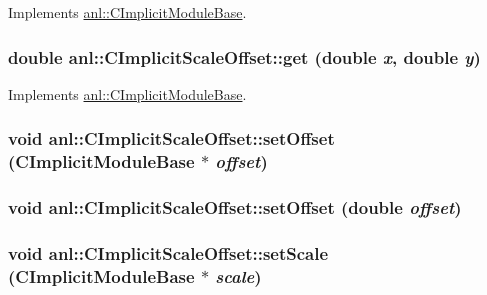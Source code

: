 Implements \hyperlink{classanl_1_1CImplicitModuleBase_ac17d592612c82ba3d47f9229a00b1fe3}{anl::CImplicitModuleBase}.\hypertarget{classanl_1_1CImplicitScaleOffset_ac23178ec8ef455748dfc75684515c291}{
\subsubsection[{get}]{\setlength{\rightskip}{0pt plus 5cm}double anl::CImplicitScaleOffset::get (double {\em x}, \/  double {\em y})}}
\label{classanl_1_1CImplicitScaleOffset_ac23178ec8ef455748dfc75684515c291}


Implements \hyperlink{classanl_1_1CImplicitModuleBase_ab88f8a1822dcfbc13ba5230318b0acd1}{anl::CImplicitModuleBase}.\hypertarget{classanl_1_1CImplicitScaleOffset_a264fb477f5b1e33c6fc395d2a33a3fcf}{
\subsubsection[{setOffset}]{\setlength{\rightskip}{0pt plus 5cm}void anl::CImplicitScaleOffset::setOffset ({\bf CImplicitModuleBase} $\ast$ {\em offset})}}
\label{classanl_1_1CImplicitScaleOffset_a264fb477f5b1e33c6fc395d2a33a3fcf}
\hypertarget{classanl_1_1CImplicitScaleOffset_ae9d26d26b04003bef03f4eb889d00169}{
\subsubsection[{setOffset}]{\setlength{\rightskip}{0pt plus 5cm}void anl::CImplicitScaleOffset::setOffset (double {\em offset})}}
\label{classanl_1_1CImplicitScaleOffset_ae9d26d26b04003bef03f4eb889d00169}
\hypertarget{classanl_1_1CImplicitScaleOffset_a2edcad5fbfaa89e5fe28ef5b33ef823b}{
\subsubsection[{setScale}]{\setlength{\rightskip}{0pt plus 5cm}void anl::CImplicitScaleOffset::setScale ({\bf CImplicitModuleBase} $\ast$ {\em scale})}}
